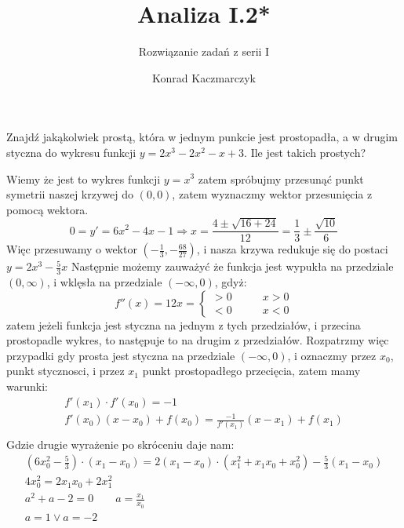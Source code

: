 \documentclass[12pt]{scrartcl}
\author{Konrad Kaczmarczyk}
\begin{document}
  \title{Analiza I.2*}
  \subtitle{Rozwiązanie zadań z serii I}
  \maketitle
    \begin{zadanie}
        Znajdź jakąkolwiek prostą, która w jednym punkcie jest prostopadła, a w drugim styczna do
wykresu funkcji $y = 2x^3 - 2x^2 - x + 3$. Ile jest takich prostych?
    \end{zadanie}
    
    Wiemy że jest to wykres funkcji $y = x^3$ zatem spróbujmy przesunąć punkt symetrii naszej krzywej do $(0, 0)$, zatem wyznaczmy wektor przesunięcia z pomocą wektora.
    \[
        0 = y' = 6 x^2 - 4 x - 1 \Rightarrow x = \frac{4 \pm \sqrt{16 + 24} }{12} = \frac{1}{3} \pm \frac{\sqrt{10} }{6}
    \]
    Więc przesuwamy o wektor $(-\frac{1}{3}, -\frac{68}{27}) $, i nasza krzywa redukuje się do postaci $y = 2x^3 - \frac{5}{3} x$
    Następnie możemy zauważyć że funkcja jest wypukła na przedziale $\left ( 0, \infty  \right )$, i wklęsła na przedziale $\left ( - \infty , 0 \right )$, gdyż:
    \[
        f''(x) = 12x =
        \begin{cases}
          > 0 \qquad & x > 0 \\
          < 0 \qquad & x < 0
        \end{cases}
    \]
    zatem jeżeli funkcja jest styczna na jednym z tych przedziałów, i przecina prostopadle wykres, to następuje to na drugim z przedziałów.
    Rozpatrzmy więc przypadki gdy prosta jest styczna na przedziale $\left ( - \infty, 0 \right )$, i oznaczmy przez $x_{0}$, punkt stycznosci, i przez $x_{1}$ punkt prostopadłego przecięcia, zatem mamy warunki:
    \begin{gather*}
        f'(x_{1}) \cdot f'(x_0) = -1 \\
        f'(x_{0}) (x - x_{0}) + f(x_0) = \frac{-1}{f'(x_{1})} \left ( x -  x_{1} \right ) + f \left ( x_1 \right ) \\
    \end{gather*}
    Gdzie drugie wyrażenie po skróceniu daje nam:
    \begin{gather*}
        \left ( 6 x^2_0 - \frac{5}{3} \right ) \cdot  \left ( x_{1} - x_{0} \right ) = 2 \left ( x_{1} - x_{0} \right ) \cdot  \left ( x^2_{1} + x_{1} x_{0} + x^2_0 \right ) - \frac{5}{3} \left ( x_{1} - x_{0} \right ) \\
        4x_0^2 = 2x_{1} x_{0} + 2x^2_{1} \\
        a^2 + a - 2 = 0 \qquad a = \frac{x_{1}}{x_{0}} \\
        a = 1 \vee a = -2
    \end{gather*}
    
\end{document}
